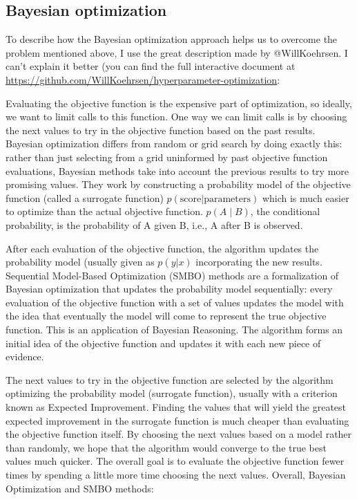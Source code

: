 \begin{subappendices}
\subsection{Bayesian optimization}

To describe how the Bayesian optimization approach helps us to overcome the problem mentioned above, I use the great description made by @WillKoehrsen. I can't explain it better (you can find the full interactive document at \url{https://github.com/WillKoehrsen/hyperparameter-optimization}:

\begin{itshape}
Evaluating the objective function is the expensive part of optimization, so ideally, we want to limit calls to this function. One way we can limit calls is by choosing the next values to try in the objective function based on the past results. Bayesian optimization differs from random or grid search by doing exactly this: rather than just selecting from a grid uninformed by past objective function evaluations, Bayesian methods take into account the previous results to try more promising values. They work by constructing a probability model of the objective function (called a surrogate function) $p(\text{score} | \text{parameters})$ which is much easier to optimize than the actual objective function. $p (A\mid B)$, the conditional probability, is the probability of A given B, i.e., A after B is observed.


After each evaluation of the objective function, the algorithm updates the probability model (usually given as $p(y | x)$ incorporating the new results. Sequential Model-Based Optimization (\gls{SMBO}) methods are a formalization of Bayesian optimization that updates the probability model sequentially: every evaluation of the objective function with a set of values updates the model with the idea that eventually the model will come to represent the true objective function. This is an application of Bayesian Reasoning. The algorithm forms an initial idea of the objective function and updates it with each new piece of evidence.

The next values to try in the objective function are selected by the algorithm optimizing the probability model (surrogate function), usually with a criterion known as Expected Improvement. Finding the values that will yield the greatest expected improvement in the surrogate function is much cheaper than evaluating the objective function itself. By choosing the next values based on a model rather than randomly, we hope that the algorithm would converge to the true best values much quicker. The overall goal is to evaluate the objective function fewer times by spending a little more time choosing the next values. Overall, Bayesian Optimization and \gls{SMBO} methods:


\end{itshape}
\end{subappendices}
